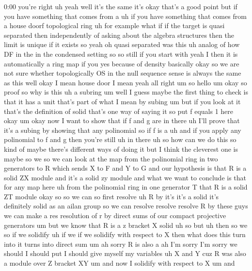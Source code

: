 \begin{unfinished}{0:00}
you're  right  uh  yeah
well  it's  the
same  it's  okay  that's  a  good  point  but
if  you  have  something  that  comes  from  a
uh  if  you  have  something  that  comes  from
a  house  doorf  topological  ring  uh  for
example  what  if  if  the  target  is  quasi
separated  then  independently  of  asking
about  the  algebra  structures  then  the
limit  is  unique  if  it  exists
so  yeah  oh  quasi  separated  was  this  uh
analog  of  how  DF  in  the  in  the  condensed
setting  so  so  still  if  you  start  with
yeah
I  then  it  is  automatically  a  ring  map  if
you  yes  because  of  density
basically  okay  so  we  are  not  sure
whether  topologically  OS  in  the  null
sequence  sense  is  always  the  same  as
this  well  okay  I  mean
house  door  I  mean  yeah  all  right
um  so  hello  um  okay  so
proof  so  why  is  this  uh  a  subring  um
well  I  guess  maybe  the  first  thing  to
check  is  that  it  has  a  unit  that's  part
of  what  I  mean  by
subing  um  but  if  you  look  at  it  that's
the  definition  of  solid  that's  one  way
of  saying
it
so  put  f  equals  1  here
okay  um  okay  now  I  want  to  show  that  if
f  and  g  are  in  there  uh  I'll  prove  that
it's  a  subing  by  showing  that  any
polinomial  so  if  f  is
a
uh  and  if  you  apply  any  polinomial  to  f
and  g  then  you're  still
uh  in  there  uh  so  how  can  we  do  this  so
kind  of  maybe  there's  different  ways  of
doing  it  but  I  think  the  cleverest  one
is  maybe  so  we  so  we  can  look  at  the  map
from  the  polinomial  ring  in  two
generators  to  R  which  sends  X  to  F  and  Y
to
G  and  our  hypothesis  is  that  R  is  a
solid  ZX  module  and  it's  a  solid  zy
module  and  what  we  want  to  conclude  is
that  for  any  map  here  uh  from
the  polinomial  ring  in  one  generator  T
that  R  is  a  solid  ZT  module
okay
so  so  we  can  so  first
resolve  uh  R  by  it's  it's  a  solid  it's
definitely  solid  as  an  ailan  group  so  we
can  resolve  resolve  resolve  R  by  these
guys  we  can  make  a  res  resolution  of  r
by  direct  sums  of  our  compact  projective
generators  um  but  we  know  that  R  is  a  z
bracket  X
solid  uh
so  but  uh  then  so  we  so  if  we
solidify  uh  if  we  if  we  solidify  with
respect  to  X  then  what  does  this  turn
into  it  turns  into  direct  sum  um  ah
sorry  R  is  also  a  ah  I'm  sorry  I'm  sorry
we  should  I  should  put  I  should  give
myself  my  variables  uh  X  and  Y  cuz  R  was
also  a  module  over  Z  bracket  XY  um  and
now  I  solidify  with  respect  to  X  um  and

\end{unfinished}
